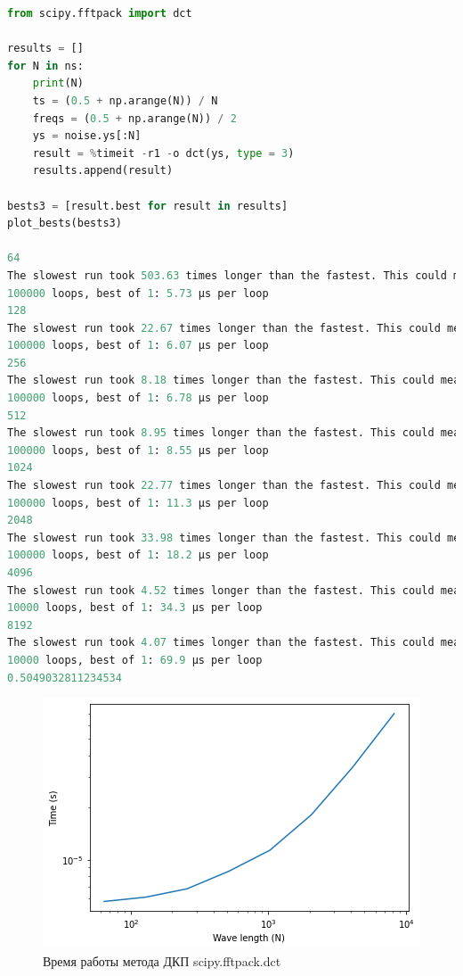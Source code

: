 \begin{lstlisting}[language=Python]
from scipy.fftpack import dct

results = []
for N in ns:
    print(N)
    ts = (0.5 + np.arange(N)) / N
    freqs = (0.5 + np.arange(N)) / 2
    ys = noise.ys[:N]
    result = %timeit -r1 -o dct(ys, type = 3)
    results.append(result)

bests3 = [result.best for result in results]
plot_bests(bests3)

64
The slowest run took 503.63 times longer than the fastest. This could mean that an intermediate result is being cached.
100000 loops, best of 1: 5.73 µs per loop
128
The slowest run took 22.67 times longer than the fastest. This could mean that an intermediate result is being cached.
100000 loops, best of 1: 6.07 µs per loop
256
The slowest run took 8.18 times longer than the fastest. This could mean that an intermediate result is being cached.
100000 loops, best of 1: 6.78 µs per loop
512
The slowest run took 8.95 times longer than the fastest. This could mean that an intermediate result is being cached.
100000 loops, best of 1: 8.55 µs per loop
1024
The slowest run took 22.77 times longer than the fastest. This could mean that an intermediate result is being cached.
100000 loops, best of 1: 11.3 µs per loop
2048
The slowest run took 33.98 times longer than the fastest. This could mean that an intermediate result is being cached.
100000 loops, best of 1: 18.2 µs per loop
4096
The slowest run took 4.52 times longer than the fastest. This could mean that an intermediate result is being cached.
10000 loops, best of 1: 34.3 µs per loop
8192
The slowest run took 4.07 times longer than the fastest. This could mean that an intermediate result is being cached.
10000 loops, best of 1: 69.9 µs per loop
0.5049032811234534
\end{lstlisting}

\begin{figure}[H]
	\begin{center}
		\includegraphics[scale=1]{fig/lab06/lab06_03.png}
		\caption{Время работы метода ДКП scipy.fftpack.dct}
	\end{center}
\end{figure}

